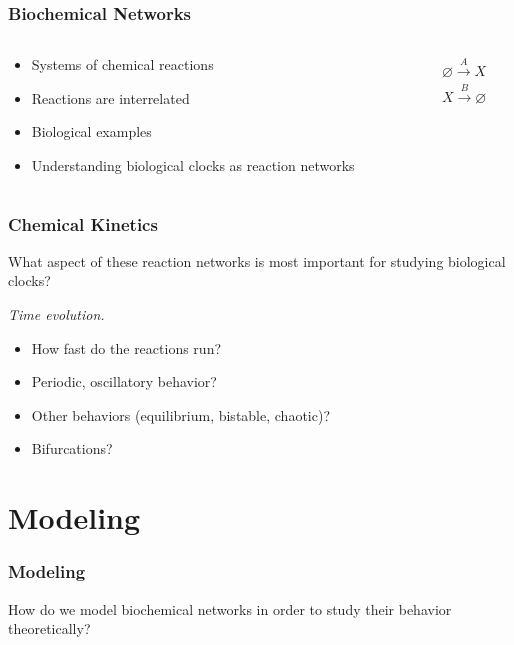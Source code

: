 \documentclass[xcolor={usenames,dvipsnames,svgnames}]{beamer}
\begin{document}
\begin{frame}
    \frametitle{Biochemical Networks}
    \begin{columns}[c]
        \begin{column}{0.5\textwidth}
            \begin{itemize}
                \item Systems of chemical reactions
                \item Reactions are interrelated
                \item Biological examples
                \item Understanding biological clocks as reaction networks
            \end{itemize}
        \end{column}
        \begin{column}{0.5\textwidth}
            \begin{align*}
                \varnothing \xrightarrow{A} X \\
                X \xrightarrow {B} \varnothing
            \end{align*}
        \end{column}
    \end{columns}
\end{frame}

\begin{frame}
    \frametitle{Chemical Kinetics}
    What aspect of these reaction networks is most important for studying biological clocks?
    \pause

    \emph{Time evolution.}
    \begin{itemize}
        \item How fast do the reactions run?
        \item Periodic, oscillatory behavior?
        \item Other behaviors (equilibrium, bistable, chaotic)?
        \item Bifurcations?
    \end{itemize}
\end{frame}


\section{Modeling} %
\label{sec:modeling}

\begin{frame}
    \frametitle{Modeling}
    How do we model biochemical networks in order to study their behavior theoretically?
\end{frame}
\end{document}
